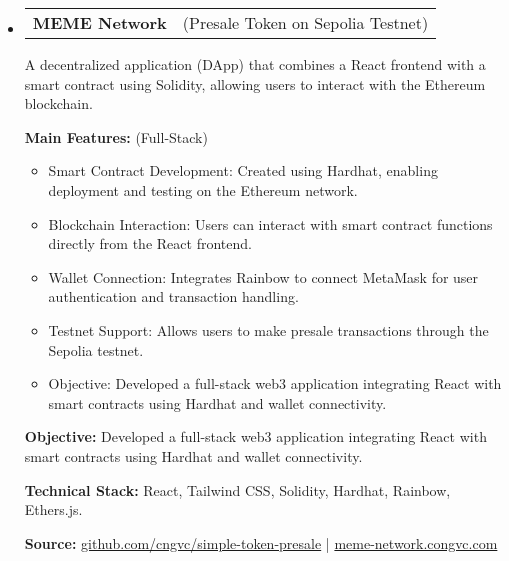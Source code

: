 \documentclass[letterpaper,11pt]{article}
\makeatletter
\newcommand{\resumeProjectTitle}[2]{
  \vspace{-2pt}\item
    \begin{tabular*}{1\textwidth}[t]{l @{\hskip 2pt} r}
      \textbf{#1} & \small #2 \\
    \end{tabular*}\vspace{2pt}
}
\newcommand{\resumeDesc}[1]{
  {#1\\ \vspace{2px}}
}
\newcommand{\resumeItem}[1]{
  \item{#1 \vspace{-2pt}}
}
\newcommand{\resumeItemListTitle}[1]{%
  \vspace{0pt} \textbf{#1} \vspace{-2pt}%
}
\newcommand{\resumeItemListStart}{\vspace{-4pt}\begin{itemize}[leftmargin=12px]}
\newcommand{\resumeItemListEnd}{\end{itemize}\vspace{-5pt}}
\newcommand{\resumeSubHeadingListStart}{\begin{itemize}[leftmargin=0pt, label={}]}
\newcommand{\resumeSubHeadingListEnd}{\end{itemize}\vspace{-8pt}}
\makeatother
\begin{document}
\resumeSubHeadingListStart
\resumeProjectTitle{MEME Network}{(Presale Token on Sepolia Testnet)}
\resumeDesc{A decentralized application (DApp) that combines a React frontend with a smart contract using Solidity, allowing users to interact with the Ethereum blockchain.}
\resumeItemListTitle{Main Features:} (Full-Stack)
\resumeItemListStart
    \resumeItem{Smart Contract Development: Created using Hardhat, enabling deployment and testing on the Ethereum network.}
    \resumeItem{Blockchain Interaction: Users can interact with smart contract functions directly from the React frontend.}
    \resumeItem{Wallet Connection: Integrates Rainbow to connect MetaMask for user authentication and transaction handling.}
    \resumeItem{Testnet Support: Allows users to make presale transactions through the Sepolia testnet.}
    \resumeItem{Objective: Developed a full-stack web3 application integrating React with smart contracts using Hardhat and wallet connectivity.}
\resumeItemListEnd
\resumeItemListTitle{Objective:} Developed a full-stack web3 application integrating React with smart contracts using Hardhat and wallet connectivity.
\par
\resumeItemListTitle{Technical Stack:} React, Tailwind CSS, Solidity, Hardhat, Rainbow, Ethers.js.
\par
\noindent\textbf{Source:} \url{github.com/cngvc/simple-token-presale} | \url{meme-network.congvc.com}

\resumeSubHeadingListEnd

\end{document}
